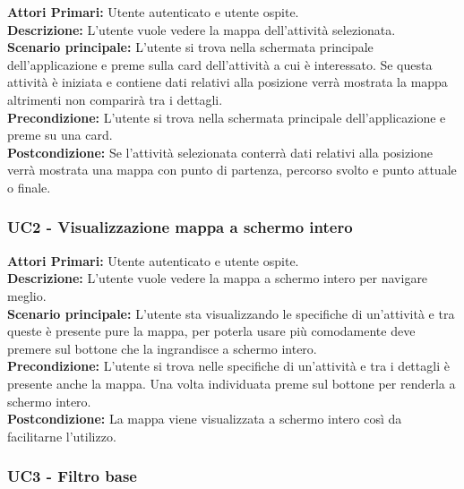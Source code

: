 	\textbf{Attori Primari:} Utente autenticato e utente ospite.\\
	\textbf{Descrizione:} L'utente vuole vedere la mappa dell'attività selezionata.\\
	\textbf{Scenario principale:} L'utente si trova nella schermata principale dell'applicazione e preme sulla card dell'attività a cui è interessato. Se questa attività è iniziata e contiene dati relativi alla posizione verrà mostrata la mappa altrimenti non comparirà tra i dettagli.\\
	\textbf{Precondizione:} L'utente si trova nella schermata principale dell'applicazione e preme su una card.\\
	\textbf{Postcondizione:} Se l'attività selezionata conterrà dati relativi alla posizione verrà mostrata una mappa con punto di partenza, percorso svolto e punto attuale o finale.\\


\subsubsection{ UC2 - Visualizzazione mappa a schermo intero}

\textbf{Attori Primari:} Utente autenticato e utente ospite.\\
\textbf{Descrizione:} L'utente vuole vedere la mappa a schermo intero per navigare meglio.\\
\textbf{Scenario principale:} L'utente sta visualizzando le specifiche di un'attività e tra queste è presente pure la mappa, per poterla usare più comodamente deve premere sul bottone che la ingrandisce a schermo intero.\\
\textbf{Precondizione:} L'utente si trova nelle specifiche di un'attività e tra i dettagli è presente anche la mappa. Una volta individuata preme sul bottone per renderla a schermo intero.\\
\textbf{Postcondizione:} La mappa viene visualizzata a schermo intero così da facilitarne l'utilizzo.\\

\subsubsection{ UC3 - Filtro base}

